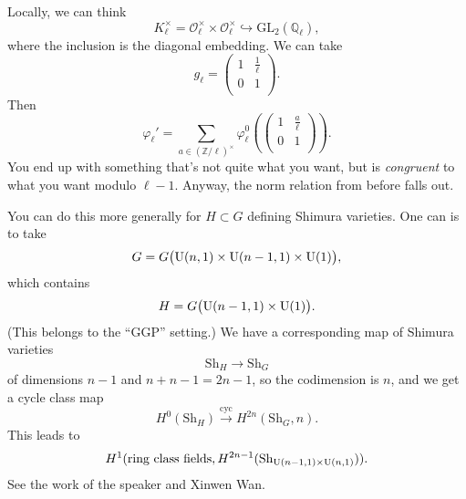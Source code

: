 \documentclass[reqno]{amsart} 
\numberwithin{theorem}{section}
\numberwithin{equation}{section}
\numberwithin{exercise}{section}
\begin{document}
Locally, we can think
\begin{equation*}
  K_{\ell}^\times = \mathcal{O}_{\ell}^\times \times \mathcal{O}_{\ell}^\times \hookrightarrow \mathrm{GL}_2(\mathbb{Q}_{\ell}),
\end{equation*}
where the inclusion is the diagonal embedding.  We can take
\begin{equation*}
  g_{\ell} =
  \begin{pmatrix}
    1 & \frac{1}{\ell} \\
    0 & 1 \\
  \end{pmatrix}.
\end{equation*}
Then
\begin{equation*}
  \varphi_{\ell} '
  = \sum
  _{a \in(\mathbb{Z} / \ell)^\times}
  \varphi_{\ell}^0 \left(
    \begin{pmatrix}
    1      & \frac{a}{\ell} \\
    0             & 1 \\
    \end{pmatrix} \right).
\end{equation*}
You end up with something that's not quite what you want, but is \emph{congruent} to what you want modulo $\ell - 1$.  Anyway, the norm relation from before falls out.

You can do this more generally for $H \subset G$ defining Shimura varieties.  One can is to take
\begin{equation*}
  G = G\bigl(\operatorname{U}(n, 1) \times \operatorname{U}(n - 1, 1) \times \operatorname{U}(1)\bigr),
\end{equation*}
which contains
\begin{equation*}
  H = G \bigl( \operatorname{U}(n - 1, 1) \times \operatorname{U}(1) \bigr).
\end{equation*}
(This belongs to the ``GGP'' setting.)  We have a corresponding map of Shimura varieties
\begin{equation*}
  \mathrm{Sh}_H \rightarrow \mathrm{Sh}_G
\end{equation*}
of dimensions $n - 1$ and $n + n - 1 = 2 n - 1$, so the codimension is $n$, and we get a cycle class map
\begin{equation*}
  H^0(\mathrm{Sh}_H) \xrightarrow{\mathrm{cyc}} H^{2 n}(\mathrm{Sh}_G, n).
\end{equation*}
This leads to
\begin{equation*}
  H^1(\text{ring class fields}, H^{2 n - 1}(\mathrm{Sh}_{\operatorname{U}(n - 1, 1) \times \operatorname{U}(n, 1)})).
\end{equation*}
See the work of the speaker and Xinwen Wan.
\end{document}
